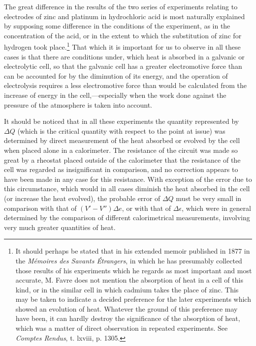 \documentclass[12pt]{memoir}
\begin{document}
The great difference in the results of the two series of experiments relating to electrodes of zinc and platinum in hydrochloric acid is most naturally explained by supposing some difference in the conditions of the experiment, as in the concentration of the acid, or in the extent to which the substitution of zinc for hydrogen took place.\footnote{It should perhaps be stated that in his extended memoir published in 1877 in the \textit{M\'{e}moires des Savants \'{E}trangers}, in which he has presumably collected those results of his experiments which he regards as most important and most accurate, M. Favre does not mention the absorption of heat in a cell of this kind, or in the similar cell in which cadmium takes the place of zinc. This may be taken to indicate a decided preference for the later experiments which showed an evolution of heat. Whatever the ground of this preference may have been, it can hardly destroy the significance of the absorption of heat, which was a matter of direct observation in repeated experiments. See \textit{Comptes Rendus}, t. lxviii, p. 1305.} That which it is important for us to observe in all these cases is that there are conditions under, which heat is absorbed in a galvanic or electrolytic cell, so that the galvanic cell has a greater electromotive force than can be accounted for by the diminution of its energy, and the operation of electrolysis requires a less electromotive force than would be calculated from the increase of energy in the cell,---especially when the work done against the pressure of the atmosphere is taken into account.

It should be noticed that in all these experiments the quantity represented by $\Delta Q$ (which is the critical quantity with respect to the point at issue) was determined by direct measurement of the heat absorbed or evolved by the cell when placed alone in a calorimeter. The resistance of the circuit was made so great by a rheostat placed outside of the calorimeter that the resistance of the cell was regarded as insignificant in comparison, and no correction appears to have been made in any case for this resistance. With exception of the error due to this circumstance, which would in all cases diminish the heat absorbed in the cell (or increase the heat evolved), the probable error of $\Delta Q$ must be very small in comparison with that of $(V'- V'')\Delta e$, or with that of $\Delta \epsilon$, which were in general determined by the comparison of different calorimetrical measurements, involving very much greater quantities of heat.
\end{document}
